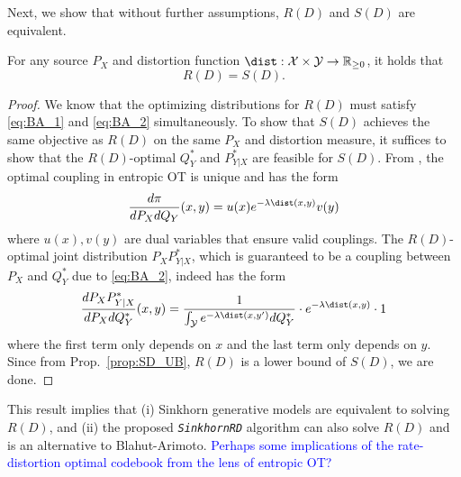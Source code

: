 \documentclass[11pt]{article}
\begin{document}


        Next, we show that without further assumptions, $R(D)$ and $S(D)$ are equivalent.
        \begin{theorem}
            For any source $P_X$ and distortion function $\dist: \mathcal{X} \times \mathcal{Y} \rightarrow \mathbb{R}_{\geq 0}$, it holds that
            \begin{equation}
                R(D) = S(D).
            \end{equation}
        \end{theorem}
        \begin{proof}
            We know that the optimizing distributions for $R(D)$ must satisfy \eqref{eq:BA_1} and \eqref{eq:BA_2} simultaneously. To show that $S(D)$ achieves the same objective as $R(D)$ on the same $P_X$ and distortion measure, it suffices to show that the $R(D)$-optimal $Q_Y^*$ and $P_{Y|X}^*$ are feasible for $S(D)$. From \cite[Ch.~4, Prop.~4.3]{ComputationalOT}, the optimal coupling in entropic OT is unique and has the form 
            \begin{equation}
            \frac{d\pi}{dP_X dQ_Y} (x,y) = u(x) e^{-\lambda \dist(x,y)} v(y)
            \end{equation}
            where $u(x), v(y)$ are dual variables that ensure valid couplings. The $R(D)$-optimal joint distribution $P_XP_{Y|X}^*$, which is guaranteed to be a coupling between $P_X$ and $Q_Y^*$ due to \eqref{eq:BA_2}, indeed has the form
            \begin{equation}
                \frac{dP_XP_{Y|X}^*}{dP_X dQ_Y^*}(x,y) = \frac{1}{\int_{\mathcal{Y}}e^{-\lambda \dist(x,y')}dQ_Y^*} \cdot e^{-\lambda \dist(x,y)} \cdot 1
            \end{equation}
           where the first term only depends on $x$ and the last term only depends on $y$.
            Since from Prop.~\ref{prop:SD_UB}, $R(D)$ is a lower bound of $S(D)$, we are done.
        \end{proof}
        \begin{remark}
            This result implies that (i) Sinkhorn generative models are equivalent to solving $R(D)$, and (ii) the proposed \emph{\texttt{SinkhornRD}} algorithm can also solve $R(D)$ and is an alternative to Blahut-Arimoto. \textcolor{blue}{Perhaps some implications of the rate-distortion optimal codebook from the lens of entropic OT?}
        \end{remark}
\end{document}
